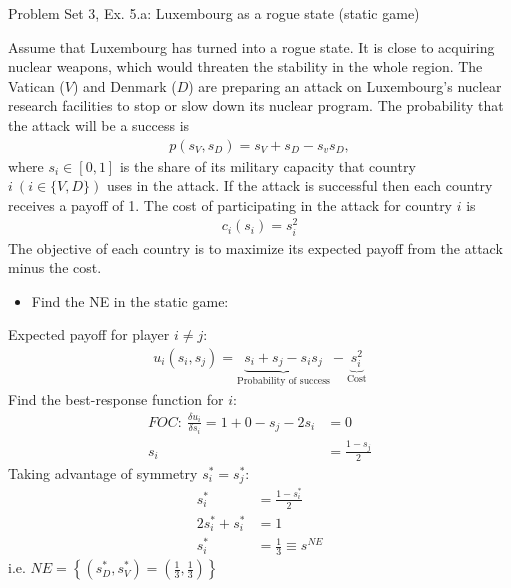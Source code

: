 \begin{frame}{Problem Set 3, Ex. 5.a: Luxembourg as a rogue state (static game)}
  \begin{multicols}{2}
    Assume that Luxembourg has turned into a rogue state. It is close to acquiring nuclear weapons, which would threaten the stability in the whole region. The Vatican ($V$) and Denmark ($D$) are preparing an attack on Luxembourg’s nuclear research facilities to stop or slow down its nuclear program. The probability that the attack will be a success is
    \begin{align*}
      p(s_V,s_D)=s_V+s_D-s_vs_D,
    \end{align*}
    where $s_i\in[0,1]$ is the share of its military capacity that country $i\ (i\in\{V,D\})$ uses in the attack. If the attack is successful then each country receives a payoff of 1. The cost of participating in the attack for country $i$ is
    \begin{align*}
      c_i(s_i)=s_i^2
    \end{align*}
    The objective of each country is to maximize its expected payoff from the attack minus the cost.
  \vfill\null\columnbreak
    \begin{itemize}
      \item[(a)] Find the NE in the static game:
    \end{itemize}
    Expected payoff for player $i\neq j$:
    \begin{align*}
      u_i(s_i,s_j)=\underbrace{s_i+s_j-s_is_j}_\text{Probability of success}-\underbrace{s_i^2}_\text{Cost}
    \end{align*}
    Find the best-response function for $i$:
    \begin{align*}
      FOC:\ \frac{\delta u_i}{\delta s_i}=1+0-s_j-2s_i&=0\\
       s_i&=\frac{1-s_j}{2}
    \end{align*}
    Taking advantage of symmetry $s_i^{*}=s_j^{*}$:
    \begin{align*}
       s_i^{*}&=\frac{1-s_i^{*}}{2}\\
      2s_i^{*}+s_i^{*}&=1\\
       s_i^{*}&=\frac{1}{3}\equiv s^{NE}
    \end{align*}
    i.e. $NE=\left\{(s_D^{*},s_V^{*})=(\frac{1}{3},\frac{1}{3})\right\}$
  \vfill\null
  \end{multicols}
\end{frame}

